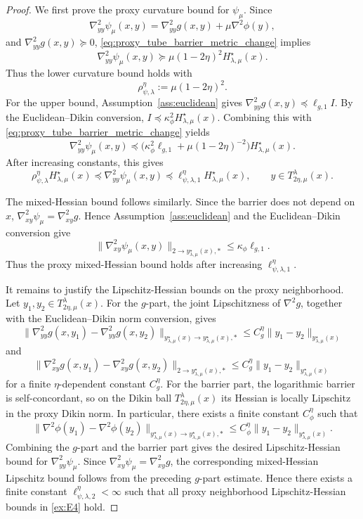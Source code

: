 \documentclass{article}
\begin{document}
\begin{proof}
We first prove the proxy curvature bound for \(\psi_\mu\). Since
\[
\nabla_{yy}^2\psi_\mu(x,y)
=
\nabla_{yy}^2g(x,y)+\mu\nabla^2\phi(y),
\]
and \(\nabla_{yy}^2g(x,y)\succeq 0\), \eqref{eq:proxy_tube_barrier_metric_change} implies
\[
\nabla_{yy}^2\psi_\mu(x,y)
\succeq
\mu(1-2\eta)^2H_{\lambda,\mu}^\star(x).
\]
Thus the lower curvature bound holds with
\[
\rho_{\psi,\lambda}^\eta:=\mu(1-2\eta)^2.
\]
For the upper bound, Assumption~\ref{ass:euclidean} gives
\(\nabla_{yy}^2g(x,y)\preceq \ell_{g,1}I\). By the Euclidean--Dikin conversion,
\(I\preceq \kappa_\phi^2H_{\lambda,\mu}^\star(x)\). Combining this with
\eqref{eq:proxy_tube_barrier_metric_change} yields
\[
\nabla_{yy}^2\psi_\mu(x,y)
\preceq
\bigl(\kappa_\phi^2\ell_{g,1}
+
\mu(1-2\eta)^{-2}\bigr)H_{\lambda,\mu}^\star(x).
\]
After increasing constants, this gives
\[
\rho_{\psi,\lambda}^\eta H_{\lambda,\mu}^\star(x)
\preceq
\nabla_{yy}^2\psi_\mu(x,y)
\preceq
\ell_{\psi,\lambda,1}^\eta H_{\lambda,\mu}^\star(x),
\qquad
y\in T_{2\eta,\mu}^{\lambda}(x).
\]

The mixed-Hessian bound follows similarly. Since the barrier does not depend on \(x\),
\(\nabla_{xy}^2\psi_\mu=\nabla_{xy}^2g\). Hence Assumption~\ref{ass:euclidean} and the
Euclidean--Dikin conversion give
\[
\|\nabla_{xy}^2\psi_\mu(x,y)\|_{2\to y_{\lambda,\mu}^\star(x),*}
\le
\kappa_\phi\ell_{g,1}.
\]
Thus the proxy mixed-Hessian bound holds after increasing
\(\ell_{\psi,\lambda,1}^\eta\).

It remains to justify the Lipschitz-Hessian bounds on the proxy neighborhood. Let
\(y_1,y_2\in T_{2\eta,\mu}^{\lambda}(x)\). For the \(g\)-part, the joint Lipschitzness of
\(\nabla^2g\), together with the Euclidean--Dikin norm conversion, gives
\[
\|\nabla_{yy}^2g(x,y_1)-\nabla_{yy}^2g(x,y_2)\|_{y_{\lambda,\mu}^\star(x)\to y_{\lambda,\mu}^\star(x),*}
\le
C_g^\eta\|y_1-y_2\|_{y_{\lambda,\mu}^\star(x)}
\]
and
\[
\|\nabla_{xy}^2g(x,y_1)-\nabla_{xy}^2g(x,y_2)\|_{2\to y_{\lambda,\mu}^\star(x),*}
\le
C_g^\eta\|y_1-y_2\|_{y_{\lambda,\mu}^\star(x)}
\]
for a finite \(\eta\)-dependent constant \(C_g^\eta\). For the barrier part, the logarithmic barrier is
self-concordant, so on the Dikin ball \(T_{2\eta,\mu}^{\lambda}(x)\) its Hessian is locally Lipschitz
in the proxy Dikin norm. In particular, there exists a finite constant \(C_\phi^\eta\) such that
\[
\|\nabla^2\phi(y_1)-\nabla^2\phi(y_2)\|_{y_{\lambda,\mu}^\star(x)\to y_{\lambda,\mu}^\star(x),*}
\le
C_\phi^\eta\|y_1-y_2\|_{y_{\lambda,\mu}^\star(x)} .
\]
Combining the \(g\)-part and the barrier part gives the desired Lipschitz-Hessian bound for
\(\nabla_{yy}^2\psi_\mu\). Since \(\nabla_{xy}^2\psi_\mu=\nabla_{xy}^2g\), the corresponding
mixed-Hessian Lipschitz bound follows from the preceding \(g\)-part estimate. Hence there exists a
finite constant \(\ell_{\psi,\lambda,2}^\eta<\infty\) such that all proxy neighborhood Lipschitz-Hessian bounds
in \eqref{ex:E4} hold.


\end{proof}
\end{document}
